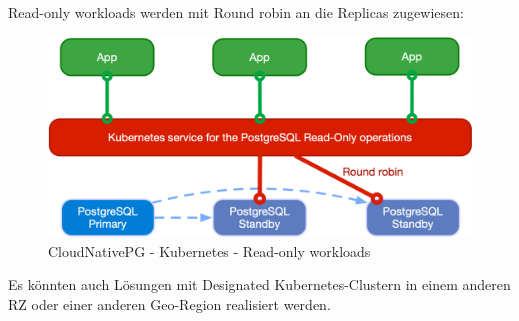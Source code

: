 \begin{flushleft}
    Read-only workloads werden mit Round robin an die Replicas zugewiesen:
    \begin{figure}[H]
        \centering
        \includegraphics[width=0.75\linewidth]{source/implementation/evaluation/postgresql_ha_solutions/cloudnativepg/cloudnativepg-architecture-read-only}
        \caption{CloudNativePG - Kubernetes - Read-only workloads}
        \label{fig:cloudnativepg-architecture-read-only}
    \end{figure}
\end{flushleft}
\begin{flushleft}
    Es könnten auch Lösungen mit Designated Kubernetes-Clustern in einem anderen RZ oder einer anderen Geo-Region realisiert werden.
\end{flushleft}
